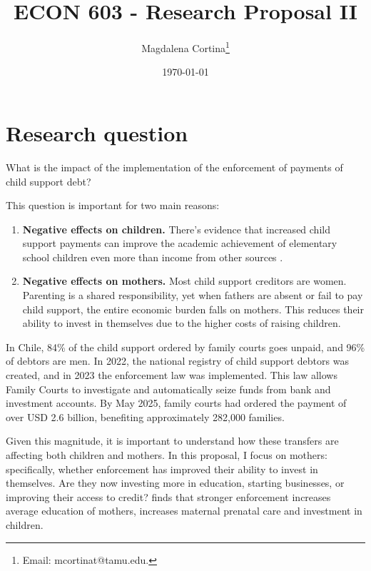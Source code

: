 

\title{\Large \textbf{ECON 603 - Research Proposal II}}
\author{Magdalena Cortina\thanks{Email: mcortinat@tamu.edu.}} 
\date{\today}






\maketitle
\thispagestyle{empty} 
\doublespacing
\thispagestyle{empty} 

\vspace{-10mm}

\doublespacing

\section{ Research question}

\noindent What is the impact of the implementation of the enforcement of payments of child support debt?

This question is important for two main reasons:

\begin{enumerate}
    \item \textbf{Negative effects on children.} There's evidence that increased child support payments can improve the academic achievement of elementary school children even more than income from other sources \citet{knox_effects_1996, nepomnyaschy_child_2012}. 
    
    \item \textbf{Negative effects on mothers.} Most child support creditors are women. Parenting is a shared responsibility, yet when fathers are absent or fail to pay child support, the entire economic burden falls on mothers. This reduces their ability to invest in themselves due to the higher costs of raising children.
\end{enumerate}

In Chile, 84\% of the child support ordered by family courts goes unpaid, and 96\% of debtors are men. In 2022, the national registry of child support debtors was created, and in 2023 the enforcement law was implemented. This law allows Family Courts to investigate and automatically seize funds from bank and investment accounts. By May 2025, family courts had ordered the payment of over USD 2.6 billion, benefiting approximately 282,000 families.

Given this magnitude, it is important to understand how these transfers are affecting both children and mothers. In this proposal, I focus on mothers: specifically, whether enforcement has improved their ability to invest in themselves. Are they now investing more in education, starting businesses, or improving their access to credit? \citet{aizer_impact_2005} finds that stronger enforcement increases average education of mothers, increases maternal prenatal care and investment in children.

